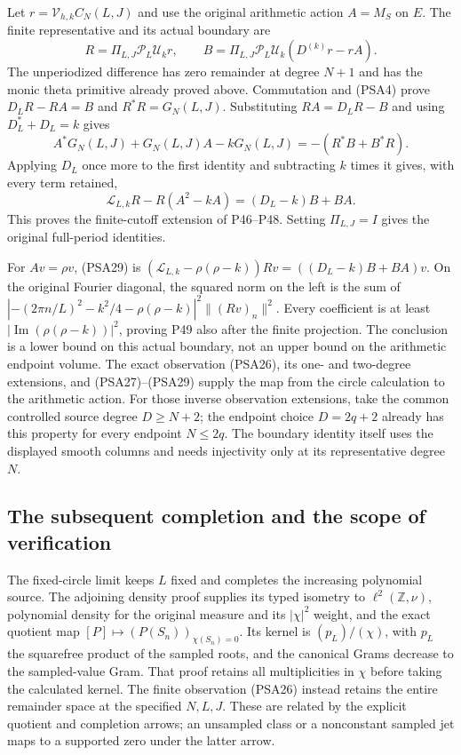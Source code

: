 Let $r=\mathcal V_{h,k}C_N(L,J)$ and use the original arithmetic
action $A=M_S$ on $E$. The finite representative and its actual
boundary are
\[
 R=\Pi_{L,J}\mathcal P_L\mathcal U_kr,\qquad
 B=\Pi_{L,J}\mathcal P_L\mathcal U_k(D^{(k)}r-rA).
 \tag{PSA27}
\]
The unperiodized difference has zero remainder at degree $N+1$ and
has the monic theta primitive already proved above. Commutation and
(PSA4) prove $D_LR-RA=B$ and $R^*R=G_N(L,J)$. Substituting
$RA=D_LR-B$ and using $D_L^*+D_L=k$ gives
\[
 A^*G_N(L,J)+G_N(L,J)A-kG_N(L,J)
 =-(R^*B+B^*R).
 \tag{PSA28}
\]
Applying $D_L$ once more to the first identity and subtracting $k$
times it gives, with every term retained,
\[
 \mathscr L_{L,k}R-R(A^2-kA)=(D_L-k)B+BA.
 \tag{PSA29}
\]
This proves the finite-cutoff extension of P46--P48. Setting
$\Pi_{L,J}=I$ gives the original full-period identities.

For $Av=\rho v$, (PSA29) is
$(\mathscr L_{L,k}-\rho(\rho-k))Rv=((D_L-k)B+BA)v$.
On the original Fourier diagonal, the squared norm on the left is
the sum of
$|-(2\pi n/L)^2-k^2/4-\rho(\rho-k)|^2\|(Rv)_n\|^2$.
Every coefficient is at least
$|\operatorname{Im}(\rho(\rho-k))|^2$, proving P49 also after the
finite projection. The conclusion is a lower bound on this actual
boundary, not an upper bound on the arithmetic endpoint volume.
The exact observation (PSA26), its one- and two-degree extensions,
and (PSA27)--(PSA29) supply the map from the circle calculation to
the arithmetic action.
For those inverse observation extensions, take the common controlled
source degree $D\ge N+2$; the endpoint choice $D=2q+2$ already has
this property for every endpoint $N\le2q$. The boundary identity
itself uses the displayed smooth columns and needs injectivity only
at its representative degree $N$.

\subsection{The subsequent completion and the scope of verification}

The fixed-circle limit keeps $L$ fixed and completes the increasing
polynomial source. The adjoining density proof supplies its typed
isometry to $\ell^2(\mathbb Z,\nu)$, polynomial density for the
original measure and its $|\chi|^2$ weight, and the exact quotient
map $[P]\mapsto(P(S_n))_{\chi(S_n)=0}$. Its kernel is
$(p_L)/(\chi)$, with $p_L$ the squarefree product of the sampled
roots, and the canonical Grams decrease to the sampled-value Gram.
That proof retains all multiplicities in $\chi$ before taking the
calculated kernel. The finite observation (PSA26) instead retains
the entire remainder space at the specified $N,L,J$. These are
related by the explicit quotient and completion arrows; an
unsampled class or a nonconstant sampled jet maps to a supported
zero under the latter arrow.

